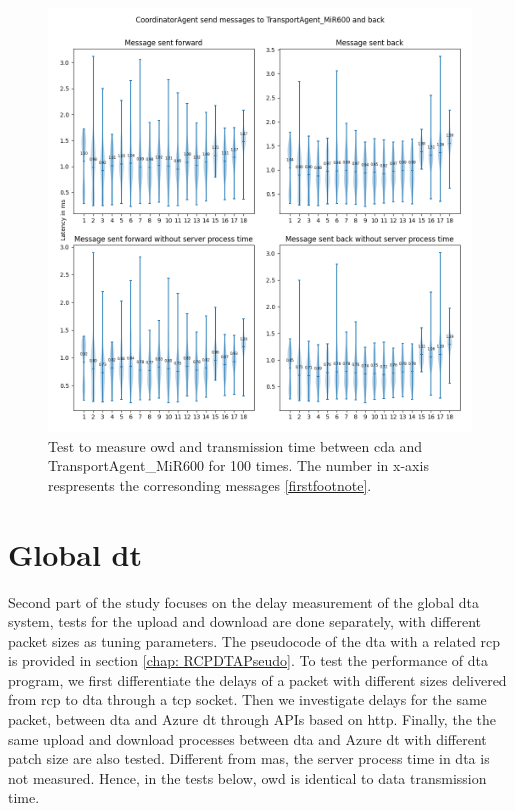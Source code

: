 \begin{figure}[htb]
    \centering
    \includegraphics[width=\textwidth]{figures/tests/usecase/violin_CoordinatorAgent_to_TransportAgent_MiR600.png}\hfill 
    \caption{Test to measure \gls{owd} and transmission time between \gls{cda} and 
    TransportAgent\_MiR600 for 100 times. The number in x-axis respresents the 
    corresonding messages \protect\ref{firstfootnote}.}
    \label{fig: violin-CDA-T600}
\end{figure}




\section{Global \gls{dt}}\label{chap: Result-External}
Second part of the study focuses on the delay measurement of the global \gls{dta} system, tests for the 
upload and download are done separately, with different packet sizes as tuning 
parameters. The pseudocode of the \gls{dta} with a related \gls{rcp} is provided 
in section \ref{chap: RCPDTAPseudo}. To test the performance of \gls{dta} program, 
we first differentiate the delays of a packet with different 
sizes delivered from \gls{rcp} to \gls{dta} through a \gls{tcp} socket. Then we investigate 
delays for the same packet, between \gls{dta} and Azure \gls{dt} through APIs based on 
\gls{http}. Finally, the the same upload and download processes between \gls{dta} and 
Azure \gls{dt} with different patch size are also tested. Different from \gls{mas}, 
the server process time in \gls{dta} is not measured. Hence, in the tests below, 
\gls{owd} is identical to data transmission time. 

